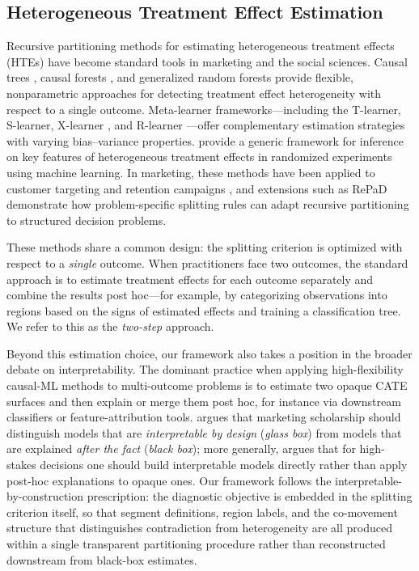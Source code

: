 \documentclass[11pt,letterpaper,english]{article}
\theoremstyle{definition}
\theoremstyle{definition}
\begin{document}
\begin{bibunit}
\subsection{Heterogeneous Treatment Effect Estimation}
\label{sec:lit-hte}

Recursive partitioning methods for estimating heterogeneous treatment effects (HTEs) have become standard tools in marketing and the social sciences. Causal trees \citep{athey2016recursive}, causal forests \citep{wager2018estimation}, and generalized random forests \citep{athey2019grf} provide flexible, nonparametric approaches for detecting treatment effect heterogeneity with respect to a single outcome. Meta-learner frameworks---including the T-learner, S-learner, X-learner \citep{kunzel2019metalearners}, and R-learner \citep{nie2021quasioracle}---offer complementary estimation strategies with varying bias--variance properties. \citet{chernozhukov2025generic} provide a generic framework for inference on key features of heterogeneous treatment effects in randomized experiments using machine learning. In marketing, these methods have been applied to customer targeting \citep{simester2020targeting, hitsch2024heterogeneous} and retention campaigns \citep{ascarza2018retention}, and extensions such as RePaD \citep{barzegary2022recursive} demonstrate how problem-specific splitting rules can adapt recursive partitioning to structured decision problems.

These methods share a common design: the splitting criterion is optimized with respect to a \emph{single} outcome. When practitioners face two outcomes, the standard approach is to estimate treatment effects for each outcome separately and combine the results post hoc---for example, by categorizing observations into regions based on the signs of estimated effects and training a classification tree. We refer to this as the \emph{two-step} approach.

Beyond this estimation choice, our framework also takes a position in the broader debate on interpretability. The dominant practice when applying high-flexibility causal-ML methods to multi-outcome problems is to estimate two opaque CATE surfaces and then explain or merge them post hoc, for instance via downstream classifiers or feature-attribution tools. \citet{rai2020explainable} argues that marketing scholarship should distinguish models that are \emph{interpretable by design} (\emph{glass box}) from models that are explained \emph{after the fact} (\emph{black box}); more generally, \citet{rudin2019stop} argues that for high-stakes decisions one should build interpretable models directly rather than apply post-hoc explanations to opaque ones. Our framework follows the interpretable-by-construction prescription: the diagnostic objective is embedded in the splitting criterion itself, so that segment definitions, region labels, and the co-movement structure that distinguishes contradiction from heterogeneity are all produced within a single transparent partitioning procedure rather than reconstructed downstream from black-box estimates.


\end{bibunit}
\end{document}
